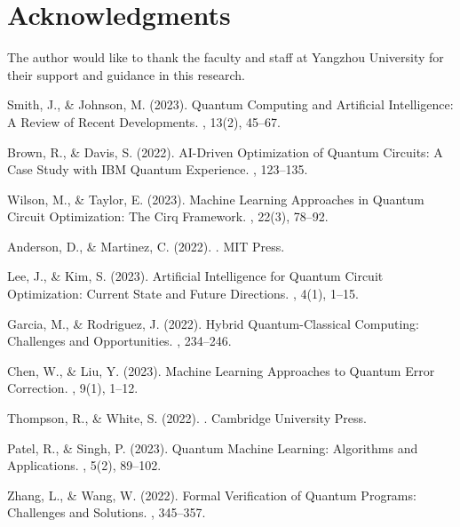 \documentclass[10pt,twocolumn]{article}
\begin{document}
\section*{Acknowledgments}
The author would like to thank the faculty and staff at Yangzhou University for their support and guidance in this research.

\begin{thebibliography}{10}
\small

Smith, J., \& Johnson, M. (2023).
\newblock Quantum Computing and Artificial Intelligence: A Review of Recent Developments.
, 13(2), 45--67.

Brown, R., \& Davis, S. (2022).
\newblock AI-Driven Optimization of Quantum Circuits: A Case Study with IBM Quantum Experience.
, 123--135.

Wilson, M., \& Taylor, E. (2023).
\newblock Machine Learning Approaches in Quantum Circuit Optimization: The Cirq Framework.
, 22(3), 78--92.

Anderson, D., \& Martinez, C. (2022).
.
\newblock MIT Press.

Lee, J., \& Kim, S. (2023).
\newblock Artificial Intelligence for Quantum Circuit Optimization: Current State and Future Directions.
, 4(1), 1--15.

Garcia, M., \& Rodriguez, J. (2022).
\newblock Hybrid Quantum-Classical Computing: Challenges and Opportunities.
, 234--246.

Chen, W., \& Liu, Y. (2023).
\newblock Machine Learning Approaches to Quantum Error Correction.
, 9(1), 1--12.

Thompson, R., \& White, S. (2022).
.
\newblock Cambridge University Press.

Patel, R., \& Singh, P. (2023).
\newblock Quantum Machine Learning: Algorithms and Applications.
, 5(2), 89--102.

Zhang, L., \& Wang, W. (2022).
\newblock Formal Verification of Quantum Programs: Challenges and Solutions.
, 345--357.

\end{thebibliography}

\balance
\end{document}
